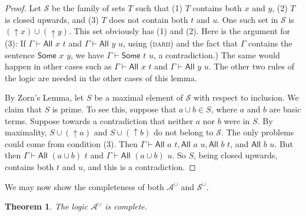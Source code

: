 \documentclass[letterpaper]{article} %
\newtheorem{theorem}{Theorem}[section]
\theoremstyle{definition}
\renewcommand{\SS}{\mathcal{S}}
\newcommand{\proves}{\vdash}
\newcommand{\Aunion}{\mathscr{A}^{\cup}}
\newcommand{\Sunion}{\mathscr{S}^{\cup}}
\newcommand{\proverule}{\textsc}
\newcommand{\darii}{\proverule{darii}}
\newcommand{\All}[2]{\mathsf{All}\,\,#1\,\,#2}
\newcommand{\Some}[2]{\mathsf{Some}\,\,#1\,\,#2}
\begin{document}
\begin{proof}
Let $\SS$ be the family of sets $T$ such that (1) $T$ contains both $x$ and $y$,
(2) $T$ is closed upwards, and
(3) $T$  does not contain both $t$ and $u$.
One such set in $\SS$ is $(\uparrow x)\cup (\uparrow y)$.  
  This set obviously has (1) and (2).
Here is the argument for (3):
 If $\Gamma \proves \All{x}{t}$
and $\Gamma \proves \All{y}{u}$, using (\darii)
and 
 the fact that $\Gamma$ contains the sentence $\Some{x}{y}$,
 we have
 $\Gamma \proves \Some{t}{u}$, a contradiction.)
The same would happen in other cases such as $\Gamma \proves \All{x}{t}$ and $\Gamma \proves \All{y}{u}$.
The other two rules of the logic are needed in the other cases of this lemma.

By Zorn's Lemma, let $S$ be a maximal element of $\SS$ with respect to inclusion.
We claim that 
$S$ is  prime.   To see this, suppose that $a \cup b\in S$,
where $a$ and $b$ are basic terms.
Suppose towards a contradiction that neither $a$ nor $b$ were in $S$.
By maximality, $S\cup(\uparrow a)$ and $S\cup(\uparrow b)$  do not belong to $\SS$. 
The only problems could come from condition (3).
Then $\Gamma \proves \All{a}{t}, \All{a}{u}, \All{b}{t}$, and $\All{b}{u}$.
But then $\Gamma \proves \All{(a \cup b)}{t}$ and $\Gamma \proves \All{(a \cup b)}{u}$.
So $S$, being closed upwards, contains both $t$ and $u$, and this is a contradiction.
\end{proof}

We may now show the completeness of both $\Aunion$ and $\Sunion$.

\begin{theorem}
    The logic $\Aunion$ is complete.
    \label{theorem-completeness-Aunion}
\end{theorem}
\end{document}
